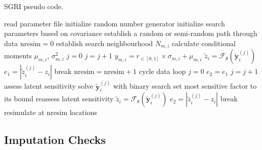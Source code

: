 \begin{algorithm}
    \caption{SGRI pseudo code.}\label{alg:sgri}
    \begin{algorithmic}[1]
        \State read parameter file
        \State initialize random number generator
        \State initialize search parameters based on covariance
         
        \State establish a random or semi-random path through data
        \State $\text{nresim} = 0$
         
         
        \State establish search neighbourhood $N_{m,i}$
        \State calculate conditional moments $\mu_{m,i}$, $\sigma_{m,i}^{2}$
        \EndFor {}
        \State $j = 0$
         
        \State $j = j + 1$
        \State $y_{m, i} = r_{\in[0,1]} \times \sigma_{m,i} + \mu_{m,i}$ 
        \EndFor
        \State $\tilde{z}_{i} = \mathcal{F}_{\theta}(\tilde{\mathbf{y}}_{i}^{{(j)}})$
        \State $e_{1} = |\tilde{z}_{i}^{(j)} - z_{i}|$ 
        \State break
        \EndIf
        \EndWhile {}
        \State $\text{nresim} = \text{nresim} + 1$
        \State cycle data loop
        \EndIf
        \State $j = 0$
        \State $e_{2} = e_{1}$
         
        \State $j = j + 1$
        \State assess latent sensitivity
        \State solve $\tilde{\mathbf{y}}_{i}^{(j)}$ with binary search
        \Else
        \State set most sensitive factor to its bound
        \State reassess latent sensitivity
        \EndIf
        \State $\tilde{z}_{i} = \mathcal{F}_{\theta}(\tilde{\mathbf{y}}_{i}^{(j)})$
        \State $e_{2} = |\tilde{z}_{i}^{(j)} - z_{i}|$ 
        \State break
        \EndIf
        \EndWhile {}
        \EndFor {}
        \State resimulate at nresim locations
        \EndIf
        \EndFor {}
    \end{algorithmic}
\end{algorithm}


\FloatBarrier
\subsection{Imputation Checks}
\label{subsec:impcheck}

